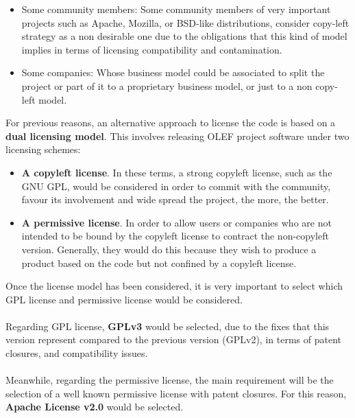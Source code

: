 \documentclass[11pt]{article}
\begin{document}
\begin{itemize}
\item{Some community members}: Some community members of very important projects such as Apache, Mozilla, or BSD-like distributions, consider copy-left strategy as a non desirable one due to the obligations that this kind of model implies in terms of licensing compatibility and contamination.
\item{Some companies}: Whose business model could be associated to split the project or part of it to a proprietary business model, or just to a non copy-left model. 
\end{itemize}
For previous reasons, an alternative approach to license the code is based on a \textbf{dual licensing model}. This involves releasing OLEF project software under two licensing schemes:
\begin{itemize}\itemsep0pt
\item{\textbf{A copyleft license}}. In these terms, a strong copyleft license, such as the GNU GPL, would be considered in order to commit with the community, favour its involvement and wide spread the project, the more, the better. 
\item{\textbf{A permissive license}}. In order to allow users or companies who are not intended to be bound by the copyleft license to contract the non-copyleft version. Generally, they would do this because they wish to produce a product based on the code but not confined by a copyleft license.
\end{itemize}
Once the license model has been considered, it is very important to select which GPL license and permissive license would be considered.\\
\\
Regarding GPL license, \textbf{GPLv3} would be selected, due to the fixes that this version represent compared to the previous version (GPLv2), in terms of patent closures, and compatibility issues.\\
\\
Meanwhile, regarding the permissive license, the main requirement will be the selection of a well known permissive license with patent closures. For this reason, \textbf{Apache License v2.0} would be selected.

\pagebreak
\end{document}

